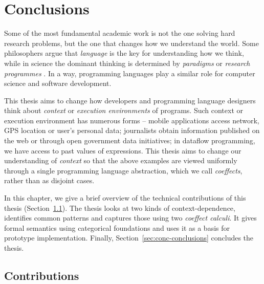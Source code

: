\chapter{Conclusions}
\label{ch:conclusions}

Some of the most fundamental academic work is not the one solving hard research problems, but the
one that changes how we understand the world. Some philosophers argue that \emph{language} is the
key for understanding how we think, while in science the dominant thinking is determined by
\emph{paradigms} \cite{philosophy-kuhn} or \emph{research programmes} \cite{philosophy-lakatos}.
In a way, programming languages play a similar role for computer science and software development.

This thesis aims to change how developers and programming language designers think about
\emph{context} or \emph{execution environments} of programs. Such context or execution environment
has numerous forms -- mobile applications access network, GPS location or user's personal data;
journalists obtain information published on the web or through open government data initiatives;
in dataflow programming, we have access to past values of expressions.
This thesis aims to change our understanding of \emph{context} so that the above examples are
viewed uniformly through a single programming language abstraction, which we call \emph{coeffects},
rather than as disjoint cases.

In this chapter, we give a brief overview of the technical contributions of this thesis
(Section~\ref{sec:conc-summary}). The thesis looks at two kinds of context-dependence, identifies
common patterns and captures those using two \emph{coeffect calculi}. It gives formal semantics
using categorical foundations and uses it as a basis for prototype implementation. Finally,
Section~\ref{sec:conc-conclusions} concludes the thesis.


%
%

\section{Contributions}
\label{sec:conc-summary}


